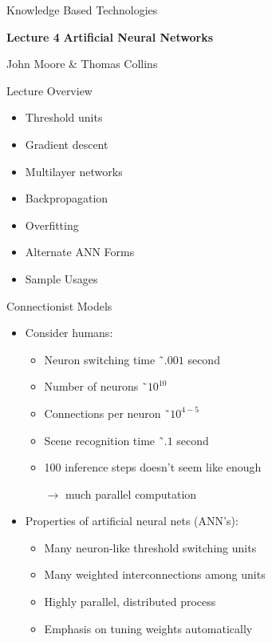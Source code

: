 \documentclass[%
pdf,
colorBG,
slideColor,
tcrico,
]{prosper}
\begin{document}
\begin{slide}{Knowledge Based Technologies}
 
\textbf{Lecture 4} 
\newline
\textbf{Artificial Neural Networks }

\small
John Moore \& Thomas Collins

\end{slide}



\begin{slide}{Lecture Overview}
\begin{itemize}
\item Threshold units
\item Gradient descent
\item Multilayer networks
\item Backpropagation
\item Overfitting 
\item Alternate ANN Forms
\item Sample Usages
\end{itemize}
\end{slide}



\begin{slide}{Connectionist Models} 
\tiny
\begin{itemize}
\item Consider humans:
	\begin{itemize}
	\item Neuron switching time \~\ $.001$ second
	\item Number of neurons \~\ $10^{10}$
	\item Connections per neuron \~\ $10^{4-5}$
	\item Scene recognition time \~\ $.1$ second
	\item 100 inference steps doesn't seem like enough
	\item[$\rightarrow$] much parallel computation
	\end{itemize}
\item Properties of artificial neural nets (ANN's):
	\begin{itemize}
	\item Many neuron-like threshold switching units
	\item Many weighted interconnections among units
	\item Highly parallel, distributed process
	\item Emphasis on tuning weights automatically
	\end{itemize}
\end{itemize}
\end{slide}
\end{document}
